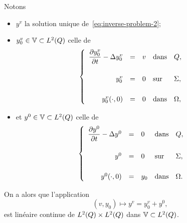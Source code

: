 \begin{remarque}%
    Notons
    \begin{itemize}
        \item $y^{v}$ la solution unique de~\eqref{eq:inverse-problem-2};
        \item $y_{0}^{v}\in \mathbb{V} \subset L^{2}\!\left({Q}\right)$ celle de
            \begin{equation*}\label{eq:null-initial-condition}
                \begin{cases}\displaystyle
                    \begin{array}{rclll}
                        \dfrac{\partial{}y_{0}^{v}}{\partial{}t} - \Delta y_{0}^{v} & = & v &
                        \text{dans} & Q,\\
                        \\
                        y_{0}^{v} & = & 0 & \text{sur} & \Sigma,\\
                        \\
                        y_{0}^{v}\!\left({\cdot,0}\right) & = & 0 &
                        \text{dans} & \Omega,
                    \end{array}
                \end{cases}
            \end{equation*}
        \item et $y^{0}\in \mathbb{V} \subset L^{2}\!\left({Q}\right)$ celle de
            \begin{equation}\label{eq:null-source-term}
                \begin{cases}\displaystyle
                    \begin{array}{rclll}
                        \dfrac{\partial{}y^{0}}{\partial{}t} - \Delta y^{0} & = & 0 &
                        \text{dans} & Q,\\
                        \\
                        y^{0} & = & 0 & \text{sur} & \Sigma,\\
                        \\
                        y^{0}\!\left({\cdot,0}\right) & = & y_{0} &
                        \text{dans} & \Omega.
                    \end{array}
                \end{cases}
            \end{equation}
    \end{itemize}
    On a alors que l'application
    \begin{equation*}
        \left({v,y_{0}}\right)\longmapsto y^{v} = y_{0}^{v} + y^{0},
    \end{equation*}
    est linéaire continue de $L^{2}\!\left({Q}\right)\times L^{2}\!\left({Q}\right)$ dans $\mathbb{V}\subset
    L^{2}\!\left({Q}\right)$.


\end{remarque}
